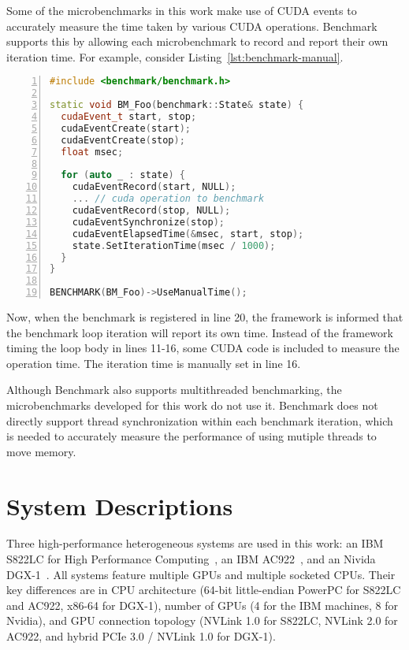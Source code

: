 Some of the microbenchmarks in this work make use of CUDA events to accurately measure the time taken by various CUDA operations.
Benchmark supports this by allowing each microbenchmark to record and report their own iteration time.
For example, consider Listing~\ref{lst:benchmark-manual}.

\begin{lstlisting}[language=C++, caption=Benchmark with manual timing., label=lst:benchmark-manual, numbers=left]
#include <benchmark/benchmark.h>

static void BM_Foo(benchmark::State& state) {
  cudaEvent_t start, stop;
  cudaEventCreate(start);
  cudaEventCreate(stop);
  float msec;

  for (auto _ : state) {
    cudaEventRecord(start, NULL);
    ... // cuda operation to benchmark
    cudaEventRecord(stop, NULL);
    cudaEventSynchronize(stop);
    cudaEventElapsedTime(&msec, start, stop);
    state.SetIterationTime(msec / 1000);
  }
}

BENCHMARK(BM_Foo)->UseManualTime();
\end{lstlisting}

Now, when the benchmark is registered in line 20, the framework is informed that the benchmark loop iteration will report its own time.
Instead of the framework timing the loop body in lines 11-16, some CUDA code is included to measure the operation time.
The iteration time is manually set in line 16.

Although Benchmark also supports multithreaded benchmarking, the microbenchmarks developed for this work do not use it.
Benchmark does not directly support thread synchronization within each benchmark iteration, which is needed to accurately measure the performance of using mutiple threads to move memory.

\section{System Descriptions}
\label{sec:system-descriptions}

Three high-performance heterogeneous systems are used in this work: an IBM S822LC for High Performance Computing~\cite{caldeira2016s822lc}, an IBM AC922~\cite{caldeira2018ac922}, and an Nivida DGX-1~\cite{nvidia2017dgx1}.
All systems feature multiple GPUs and multiple socketed CPUs.
Their key differences are in CPU architecture (64-bit little-endian PowerPC for S822LC and AC922, x86-64 for DGX-1), number of GPUs (4 for the IBM machines, 8 for Nvidia), and GPU connection topology (NVLink 1.0 for S822LC, NVLink 2.0 for AC922, and hybrid PCIe 3.0 / NVLink 1.0 for DGX-1).

